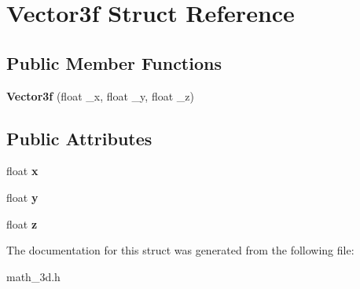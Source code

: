 \hypertarget{structVector3f}{\section{Vector3f Struct Reference}
\label{structVector3f}
}
\subsection*{Public Member Functions}
\begin{DoxyCompactItemize}
\item 
\hypertarget{structVector3f_ac2caf1fd41076826fe50b3a527ef90db}{{\bfseries Vector3f} (float \-\_\-x, float \-\_\-y, float \-\_\-z)}\label{structVector3f_ac2caf1fd41076826fe50b3a527ef90db}

\end{DoxyCompactItemize}
\subsection*{Public Attributes}
\begin{DoxyCompactItemize}
\item 
\hypertarget{structVector3f_a4aca0751716b7099b397e8c63b16bfcf}{float {\bfseries x}}\label{structVector3f_a4aca0751716b7099b397e8c63b16bfcf}

\item 
\hypertarget{structVector3f_a8a602e2ee75126feb520c2aa27e7eff5}{float {\bfseries y}}\label{structVector3f_a8a602e2ee75126feb520c2aa27e7eff5}

\item 
\hypertarget{structVector3f_a470cff51eb6463672be518f5af4e26db}{float {\bfseries z}}\label{structVector3f_a470cff51eb6463672be518f5af4e26db}

\end{DoxyCompactItemize}


The documentation for this struct was generated from the following file\-:\begin{DoxyCompactItemize}
\item 
math\-\_\-3d.\-h\end{DoxyCompactItemize}
